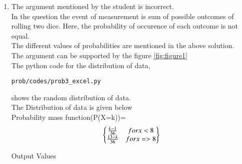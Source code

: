 \begin{enumerate}[label=\arabic*.,ref=\thesubsubsection.\theenumi]
\begin{enumerate}
\end{enumerate}
\begin{enumerate}
\item The argument mentioned by the student is incorrect.
\\
In the question the event of measurement is sum of possible outcomes of rolling two dice.
Here, the probability of occurence of each outcome is not equal. 
\\
The different values of probabilities are mentioned in the above solution.
\\
The argument can be supported by the figure \ref{fig:figure1}
\\ 
The python code for the distribution of data,
\begin{lstlisting}
prob/codes/prob3_excel.py
\end{lstlisting}
shows the random distribution of data.
\\
The Distribution of data is given below
\\
Probability mass function(P(X=k))=
\begin{align}
\begin{Bmatrix}\frac{k-1}{36}& for x<8\\\frac{13-k}{36}& for x=>8\end{Bmatrix}
\end{align}
\begin{table}[ht!]
\centering

\caption{Output Values}
\label{table:table2}	
\end{table}

\end{enumerate}
\end{enumerate}
